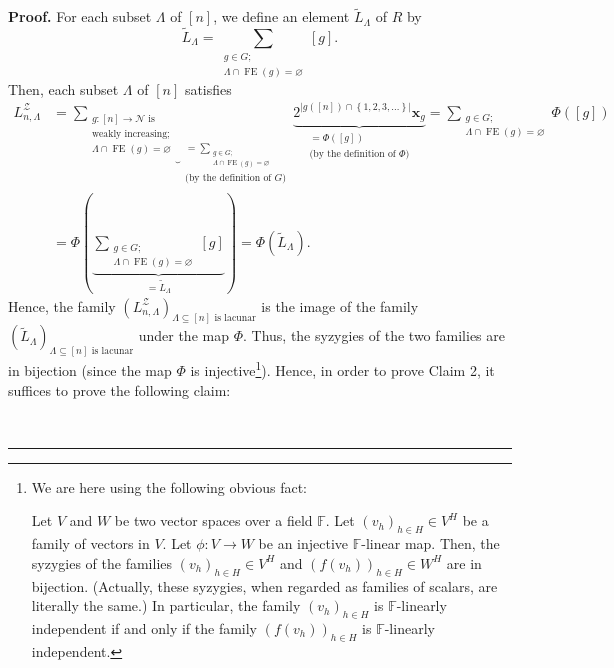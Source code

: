 \documentclass[numbers=enddot,12pt,final,onecolumn,notitlepage]{scrartcl}%
\theoremstyle{definition}
\newenvironment{proof}[1][Proof]{\noindent\textbf{#1.} }{\ \rule{0.5em}{0.5em}}
\newenvironment{verlong}{}{}
\let\sumnonlimits\sum
\renewcommand{\sum}{\sumnonlimits\limits}
\begin{document}
\begin{verlong}
\begin{proof}
For each subset $\Lambda$ of $\left[  n\right]  $, we define an element
$\widetilde{L}_{\Lambda}$ of $R$ by%
\[
\widetilde{L}_{\Lambda}=\sum_{\substack{g\in G;\\\Lambda\cap\operatorname*{FE}%
\left(  g\right)  =\varnothing}}\left[  g\right]  .
\]
Then, each subset $\Lambda$ of $\left[  n\right]  $ satisfies%
\begin{align*}
L_{n,\Lambda}^{\mathcal{Z}}  &  =\underbrace{\sum_{\substack{g:\left[
n\right]  \rightarrow\mathcal{N}\text{ is}\\\text{weakly increasing;}%
\\\Lambda\cap\operatorname*{FE}\left(  g\right)  =\varnothing}}}%
_{\substack{=\sum_{\substack{g\in G;\\\Lambda\cap\operatorname*{FE}\left(
g\right)  =\varnothing}}\\\text{(by the definition of }G\text{)}%
}}\underbrace{2^{\left\vert g\left(  \left[  n\right]  \right)  \cap\left\{
1,2,3,\ldots\right\}  \right\vert }\mathbf{x}_{g}}_{\substack{=\Phi\left(
\left[  g\right]  \right)  \\\text{(by the definition of }\Phi\text{)}}%
}=\sum_{\substack{g\in G;\\\Lambda\cap\operatorname*{FE}\left(  g\right)
=\varnothing}}\Phi\left(  \left[  g\right]  \right) \\
&  =\Phi\left(  \underbrace{\sum_{\substack{g\in G;\\\Lambda\cap
\operatorname*{FE}\left(  g\right)  =\varnothing}}\left[  g\right]
}_{=\widetilde{L}_{\Lambda}}\right)  =\Phi\left(  \widetilde{L}_{\Lambda
}\right)  .
\end{align*}
Hence, the family $\left(  L_{n,\Lambda}^{\mathcal{Z}}\right)  _{\Lambda
\subseteq\left[  n\right]  \text{ is lacunar}}$ is the image of the family
$\left(  \widetilde{L}_{\Lambda}\right)  _{\Lambda\subseteq\left[  n\right]
\text{ is lacunar}}$ under the map $\Phi$. Thus, the syzygies of the two
families are in bijection (since the map $\Phi$ is injective\footnote{We are
here using the following obvious fact:
\par
Let $V$ and $W$ be two vector spaces over a field $\mathbb{F}$. Let $\left(
v_{h}\right)  _{h\in H}\in V^{H}$ be a family of vectors in $V$. Let
$\phi:V\rightarrow W$ be an injective $\mathbb{F}$-linear map. Then, the
syzygies of the families $\left(  v_{h}\right)  _{h\in H}\in V^{H}$ and
$\left(  f\left(  v_{h}\right)  \right)  _{h\in H}\in W^{H}$ are in bijection.
(Actually, these syzygies, when regarded as families of scalars, are literally
the same.) In particular, the family $\left(  v_{h}\right)  _{h\in H}$ is
$\mathbb{F}$-linearly independent if and only if the family $\left(  f\left(
v_{h}\right)  \right)  _{h\in H}$ is $\mathbb{F}$-linearly independent.}).
Hence, in order to prove Claim 2, it suffices to prove the following claim:


\end{proof}
\end{verlong}
\end{document}
